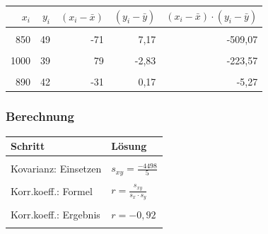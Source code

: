 \documentclass[
  11pt,
  ngerman,
  a4paper,
]{report}
\begin{document}
\begin{table}[H]
\centering
\begin{tabular}{rrrrr}
\toprule
\textbf{$x_i$} & \textbf{$y_i$} & \textbf{$(x_i-\bar{x})$} & \textbf{$(y_i-\bar{y})$} & \textbf{$(x_i-\bar{x})\cdot(y_i-\bar{y})$}\\
\midrule
\cellcolor{gray!6}{1141} & \cellcolor{gray!6}{30} & \cellcolor{gray!6}{220} & \cellcolor{gray!6}{-11,83} & \cellcolor{gray!6}{-2602,60}\\
850 & 49 & -71 & 7,17 & -509,07\\
\cellcolor{gray!6}{862} & \cellcolor{gray!6}{40} & \cellcolor{gray!6}{-59} & \cellcolor{gray!6}{-1,83} & \cellcolor{gray!6}{107,97}\\
1000 & 39 & 79 & -2,83 & -223,57\\
\cellcolor{gray!6}{783} & \cellcolor{gray!6}{51} & \cellcolor{gray!6}{-138} & \cellcolor{gray!6}{9,17} & \cellcolor{gray!6}{-1265,46}\\
890 & 42 & -31 & 0,17 & -5,27\\
\bottomrule
\end{tabular}
\end{table}

\hypertarget{berechnung-1}{%
\subsubsection{Berechnung}\label{berechnung-1}}

\begin{table}[H]
\centering
\begin{tabular}{>{\raggedright\arraybackslash}p{8cm}>{\raggedright\arraybackslash}p{8cm}}
\toprule
\textbf{Schritt} & \textbf{Lösung}\\
\midrule
\cellcolor{gray!6}{Kovarianz: Formel} & \cellcolor{gray!6}{$s_{xy}=\frac{\displaystyle \sum_{i=1}^{n}(x_{i}- \bar{x})\cdot(y_{i}-\bar{y})}{n-1}$}\\
Kovarianz: Einsetzen & $s_{xy}=\frac{-4498}{5}$\\
\cellcolor{gray!6}{Kovarianz: Ergebnis} & \cellcolor{gray!6}{$s_{xy}=-899{,}6$}\\
Korr.koeff.: Formel & $r=\frac{s_{xy}}{s_x \cdot s_y}$\\
\cellcolor{gray!6}{Korr.koeff.: Einsetzen} & \cellcolor{gray!6}{$r=\frac{-899{,}6}{128{,}97 \cdot 7{,}57}$}\\
Korr.koeff.: Ergebnis & $r=-0{,}92$\\
\cellcolor{gray!6}{Interpretieren} & \cellcolor{gray!6}{Mit dem Korrelationskoeffizienten $r\approx-0{,}92$ konnte eine starke negative Korrelation festgestellt werden. Je kleiner die Entfernung zum ÖPNV, desto höher der Mietpreis.}\\
\bottomrule
\end{tabular}
\end{table}
\end{document}
